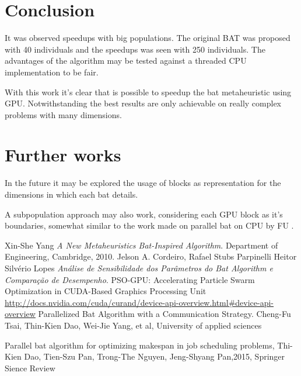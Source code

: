 \documentclass[conference]{IEEEtran}
\begin{document}
\section{Conclusion}

It was observed speedups with big populations. The original BAT was
proposed with 40 individuals and the speedups was seen with 250
individuals.
The advantages of the algorithm may be tested against a threaded CPU implementation to be fair.

With this work it's clear that is possible to speedup the bat metaheuristic using GPU. Notwithstanding the best results are only achievable on really complex problems with many dimensions.

\section{Further works}

In the future it may be explored the usage of blocks as representation for the
dimensions in which each bat details.

A subpopulation approach may also work, considering each GPU block as it's boundaries, somewhat similar to the work made on parallel bat on CPU by FU \cite{paralellCPU}.

\begin{thebibliography}{1}

    Xin-She Yang \emph{A New Metaheuristics Bat-Inspired Algorithm}. Department of Engineering, Cambridge, 2010.
    Jelson A. Cordeiro, Rafael Stubs Parpinelli Heitor Silvério Lopes \emph{Análise de Sensibilidade dos Parâmetros do Bat Algorithm e Comparação de Desempenho}.
    PSO-GPU: Accelerating Particle Swarm Optimization in CUDA-Based Graphics Processing Unit
    \url{http://docs.nvidia.com/cuda/curand/device-api-overview.html#device-api-overview}
    Parallelized Bat Algorithm with a Communication Strategy. Cheng-Fu Tsai, Thin-Kien Dao, Wei-Jie Yang, et al, University of applied sciences

    Parallel bat algorithm for optimizing makespan in job scheduling problems, Thi-Kien Dao, Tien-Szu Pan, Trong-The Nguyen, Jeng-Shyang Pan,2015, Springer Sience Review

\end{thebibliography}
\end{document}

